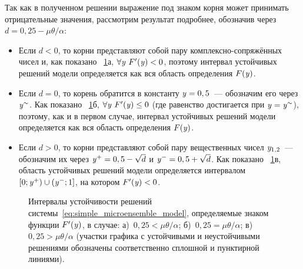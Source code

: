 Так как в полученном решении выражение под знаком корня может принимать отрицательные значения, рассмотрим результат подробнее, обозначив через $d = 0,25 - \mu \theta / \alpha$:
\begin{itemize}
    \item Если $d < 0$, то корни представляют собой пару комплексно-сопряжённых чисел и, как показано \onfigure~\ref{fig:analysis_sigm_stability}а, $\forall\mathit{y}\ F^{\prime}(\mathit{y}) < 0$, поэтому интервал устойчивых решений модели определяется как вся область определения $F(\mathit{y})$.
    \item Если $d = 0$, то корень обратится в константу $\mathit{y} = 0,5$~--- обозначим его через $\mathit{y}^{\sim}$. Как показано \onfigure~\ref{fig:analysis_sigm_stability}б, $\forall\mathit{y}\ F^{\prime}(\mathit{y}) \le 0$ (где равенство достигается при $\mathit{y} = \mathit{y}^{\sim}$), поэтому, как и в первом случае, интервал устойчивых решений модели определяется как вся область определения $F(\mathit{y})$.
    \item Если $d > 0$, то корни представляют собой пару вещественных чисел $\mathit{y}_{1,2}$~--- обозначим их через $\mathit{y}^{+} = 0,5 - \sqrt{d}$ и $\mathit{y}^{-} = 0,5 + \sqrt{d}$. Как показано \onfigure~\ref{fig:analysis_sigm_stability}в, область устойчивых решений модели определяется интервалом $\left[0; \mathit{y}^{+}\right) \cup \left(\mathit{y}^{-}; 1\right]$, на котором $F^{\prime}(\mathit{y}) < 0$.
\end{itemize}

\begin{figure}[ht]
    \begin{minipage}{\textwidth}
        \caption{Интервалы устойчивости решений системы~\eqref{eq:simple_microensemble_model}, определяемые знаком функции $F^{\prime}(\mathit{y})$, в случае: а)~$0,25 < \mu \theta / \alpha$; б)~$0,25 = \mu \theta / \alpha$; в)~$0,25 > \mu \theta / \alpha$ (участки графика с устойчивыми и неустойчивыми решениями обозначены соответственно сплошной и пунктирной линиями).}
        \label{fig:analysis_sigm_stability}
    \end{minipage}
\end{figure}

